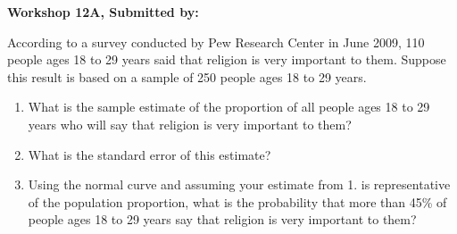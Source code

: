 \documentclass[11pt, chapterprefix=true]{scrbook}\usepackage[]{graphicx}\usepackage[]{color}
\begin{document}
\clearpage
\begin{exercises}
    \begin{exercise}  %

    \begin{center}
\begin{flushleft}\textbf{\large \hfill Workshop 12A, Submitted by: }\end{flushleft}

\end{center}

According to a survey conducted by Pew Research Center in June 2009, 110 people ages 18 to 29 years said that religion is very important to them. Suppose this result is based on a sample of 250 people ages 18 to 29 years.

\begin{enumerate}
  \item What is the sample estimate of the proportion of all people ages 18 to 29 years who will say that religion is very important to them?
  \item What is the standard error of this estimate?
  \item Using the normal curve and assuming your estimate from 1. is representative of the population proportion, what is the probability that more than 45\% of people ages 18 to 29 years say that religion is very important to them?
\end{enumerate}

\end{exercise} 
\begin{solution}  %

\end{solution}

\clearpage


\end{exercises}
\end{document}
